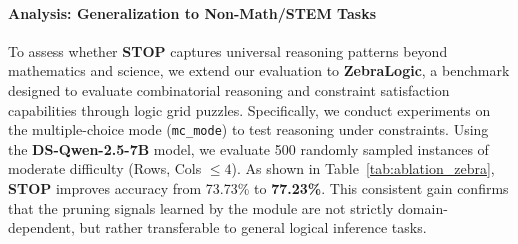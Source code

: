 \documentclass[11pt]{article}
\theoremstyle{plain}
\begin{document}
\begin{table}[ht]
\centering
\caption{Inference overhead analysis. STOP achieves near-zero cost by avoiding re-encoding.}
\label{tab:latency}
\vspace{-4mm}
\end{table}


\paragraph{Analysis: Generalization to Non-Math/STEM Tasks}
To assess whether \textbf{STOP} captures universal reasoning patterns beyond mathematics and science, we extend our evaluation to \textbf{ZebraLogic}, a benchmark designed to evaluate combinatorial reasoning and constraint satisfaction capabilities through logic grid puzzles.
Specifically, we conduct experiments on the multiple-choice mode (\texttt{mc\_mode}) to test reasoning under constraints.
Using the \textbf{DS-Qwen-2.5-7B} model, we evaluate 500 randomly sampled instances of moderate difficulty (Rows, Cols $\le 4$).
As shown in Table~\ref{tab:ablation_zebra}, \textbf{STOP} improves accuracy from 73.73\% to \textbf{77.23\%}.
This consistent gain confirms that the pruning signals learned by the module are not strictly domain-dependent, but rather transferable to general logical inference tasks.

\begin{table}[t]
\centering
\caption{\textbf{Generalization on ZebraLogic.} \textbf{STOP} \textbf{robustly generalizes} beyond math and science tasks.}
\label{tab:ablation_zebra}
\vspace{-3mm}
\end{table}
\end{document}
